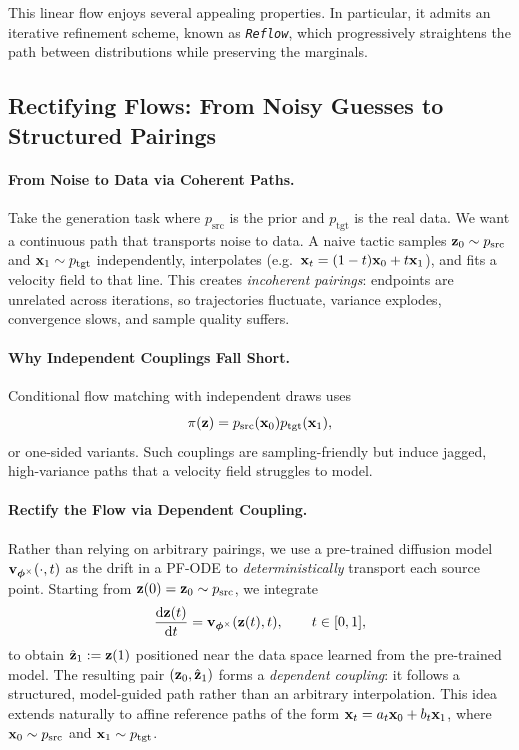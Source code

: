 This linear flow enjoys several appealing properties. 
In particular, it admits an iterative refinement scheme, known as \emph{\texttt{Reflow}}, 
which progressively straightens the path between distributions while preserving the marginals. 





\subsection{Rectifying Flows: From Noisy Guesses to Structured Pairings}\label{subsec:rectify}

\paragraph{From Noise to Data via Coherent Paths.}
Take the generation task where $p_{\text{src}}$ is the prior and $p_{\text{tgt}}$ is the real data. We want a continuous path that transports noise to data. A naive tactic samples ${\mathbf{z}}_0 \sim p_{\text{src}}$ and ${\mathbf{x}}_1 \sim p_{\text{tgt}}$ independently, interpolates (e.g.\ ${\mathbf{x}}_t=(1-t){\mathbf{x}}_0+t{\mathbf{x}}_1$), and fits a velocity field to that line. This creates \emph{incoherent pairings}: endpoints are unrelated across iterations, so trajectories fluctuate, variance explodes, convergence slows, and sample quality suffers.

\paragraph{Why Independent Couplings Fall Short.}
Conditional flow matching with independent draws uses
\[
\pi({\mathbf{z}})=p_{\text{src}}({\mathbf{x}}_0) p_{\text{tgt}}({\mathbf{x}}_1),
\]
or one-sided variants. Such couplings are sampling-friendly but induce jagged, high-variance paths that a velocity field struggles to model.

\paragraph{Rectify the Flow via Dependent Coupling.}
Rather than relying on arbitrary pairings, we use a pre-trained diffusion model ${\mathbf{v}}_{{\bm{\phi}}^\times}(\cdot,t)$ as the drift in a PF-ODE to \emph{deterministically} transport each source point. Starting from ${\mathbf{z}}(0)={\mathbf{z}}_0 \sim p_{\text{src}}$, we integrate
\[
\frac{\mathop{}\!\mathrm{d} {\mathbf{z}}(t)}{\mathop{}\!\mathrm{d} t} = {\mathbf{v}}_{{\bm{\phi}}^\times}({\mathbf{z}}(t),t), \qquad t \in [0,1],
\]
to obtain $\hat{{\mathbf{z}}}_1 := {\mathbf{z}}(1)$ positioned near the data space learned from the pre-trained model. The resulting pair $({\mathbf{z}}_0,\hat{{\mathbf{z}}}_1)$ forms a \emph{dependent coupling}: it follows a structured, model-guided path rather than an arbitrary interpolation. This idea extends naturally to affine reference paths of the form ${\mathbf{x}}_t = a_t {\mathbf{x}}_0 + b_t {\mathbf{x}}_1$, where ${\mathbf{x}}_0 \sim p_{\text{src}}$ and ${\mathbf{x}}_1 \sim p_{\text{tgt}}$.



